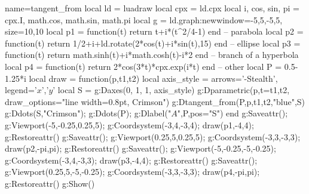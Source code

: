 \begin{luadraw}{name=tangent_from}
local ld = luadraw
local cpx = ld.cpx
local i, cos, sin, pi = cpx.I, math.cos, math.sin, math.pi
local g = ld.graph:new{window={-5,5,-5,5}, size={10,10}}
local p1 = function(t) return t+i*(t^2/4-1) end -- parabola
local p2 = function(t) return 1/2+i+ld.rotate(2*cos(t)+i*sin(t),15) end -- ellipse
local p3 = function(t) return math.sinh(t)+i*math.cosh(t)-i*2 end -- branch of a hyperbola
local p4 = function(t) return 2*cos(3*t)*cpx.exp(i*t) end -- other
local P = 0.5-1.25*i
local draw = function(p,t1,t2)
    local axis_style = { arrows='-Stealth', legend={'$x$','$y$'} }
    local S = {}
    g:Daxes({0, 1, 1}, axis_style)
    g:Dparametric(p,{t={t1,t2}, draw_options="line width=0.8pt, Crimson"})
    g:Dtangent_from(P,p,t1,t2,"blue",S)
    g:Ddots(S,"Crimson"); g:Ddots(P); g:Dlabel("$A$",P,{pos="S"})
end
g:Saveattr(); g:Viewport(-5,-0.25,0.25,5); g:Coordsystem(-3,4,-3,4); draw(p1,-4,4); g:Restoreattr()
g:Saveattr(); g:Viewport(0.25,5,0.25,5); g:Coordsystem(-3,3,-3,3); draw(p2,-pi,pi); g:Restoreattr()
g:Saveattr(); g:Viewport(-5,-0.25,-5,-0.25); g:Coordsystem(-3,4,-3,3); draw(p3,-4,4); g:Restoreattr()
g:Saveattr(); g:Viewport(0.25,5,-5,-0.25); g:Coordsystem(-3,3,-3,3); draw(p4,-pi,pi); g:Restoreattr()
g:Show()
\end{luadraw}
